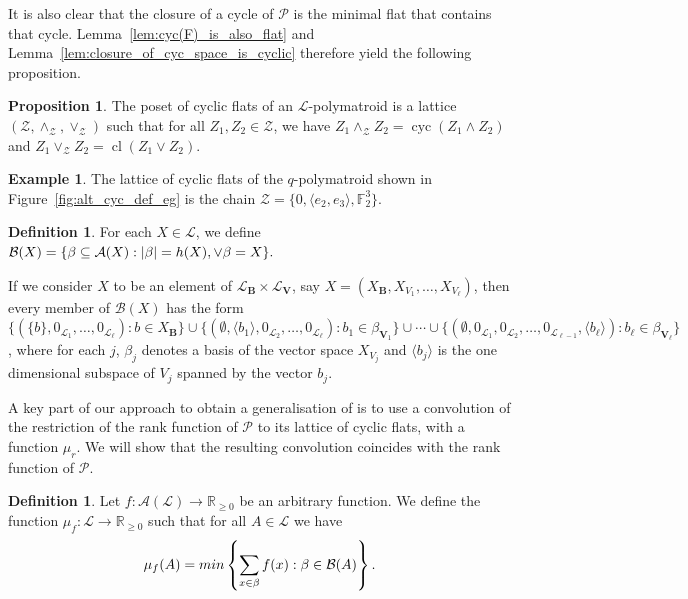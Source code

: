 \documentclass[a4paper,11pt,reqno]{article}
\theoremstyle{definition}
\newtheorem{definition}[theorem]{{{Definition}}}
\newtheorem{example}[theorem]{{{Example}}}
\newtheorem{proposition}[theorem]{{{Proposition}}}
\newcommand{\mL}{\mathcal{L}}
\newcommand{\mP}{\mathcal{P}}
\newcommand{\mA}{\mathcal{A}}
\DeclareMathOperator{\cyc}{cyc}
\DeclareMathOperator{\cl}{cl}
\begin{document}
It is also clear that the closure of a cycle of $\mP$ is the minimal flat that contains that cycle. Lemma~\ref{lem:cyc(F)_is_also_flat} and Lemma~\ref{lem:closure_of_cyc_space_is_cyclic} therefore yield the following proposition.

\begin{proposition}\label{prop:cyc_flat_lattice}
    The poset of cyclic flats of an $\mL$-polymatroid is a lattice $(\mathcal{Z},\wedge_\mathcal{Z},\vee_\mathcal{Z})$ such that for all $Z_1,Z_2\in\mathcal{Z}$, we have $Z_1\wedge_\mathcal{Z}Z_2=\cyc(Z_1\wedge Z_2)$ and $Z_1\vee_\mathcal{Z}Z_2=\cl(Z_1\vee Z_2).$
\end{proposition}

\begin{example}
    The lattice of cyclic flats of the $q$-polymatroid shown in Figure~\ref{fig:alt_cyc_def_eg} is the chain 
    $\mathcal{Z}=\{0,\langle e_2,e_3\rangle,\mathbb{F}_2^3\}.$
\end{example}

\begin{definition}
    For each $X\in\mathcal{L}$, we define
    $\mathcal{B}(X)=\{\beta\subseteq\mA(X):|\beta|=\textup{h}(X),\vee\beta=X\}.$
\end{definition}

If we consider $X$ to be an element of $\mathcal{L}_\mathbf{B}\times\mathcal{L}_\mathbf{V}$, say $X=(X_{\mathbf{B}},X_{V_1},\dots,X_{V_\ell})$, then every member of $\mathcal{B}(X)$ has the form 
    $ \{ (\{b\},0_{\mL_1},\dots,0_{\mL_\ell} ): b \in X_\mathbf{B}\} \cup \{(\emptyset,\langle b_1 \rangle ,0_{\mL_2},\dots,0_{\mL_\ell} ): b_1 \in \beta_{\mathbf{V}_1}\}\cup \cdots \cup \{(\emptyset,0_{\mL_1},0_{\mL_2},\dots,0_{\mL_{\ell-1}}, \langle b_\ell \rangle): b_\ell \in \beta_{\mathbf{V}_\ell}\} $, where for each $j$, $\beta_j$ denotes a basis of the vector space $X_{V_j}$ and $\langle b_j \rangle$ is the one dimensional subspace of $V_j$ spanned by the vector $b_j$.


A key part of our approach to obtain a generalisation of \cite{Csirm20} is to use a convolution of the restriction of the rank function of $\mP$ to its lattice of cyclic flats, with a function $\mu_r$. We will show that the resulting convolution coincides with the rank function of $\mP$. 

\begin{definition}\label{not:mu_funct}
Let $f:\mA(\mathcal{L})\to\mathbb{R}_{\geq0}$ be an arbitrary function. We define the function $\mu_f:\mathcal{L}\to\mathbb{R}_{\geq0}$ such that for all  $A \in \mL$ we have
\[
\mu_f(A)=\textup{min}\left\{\sum_{x\in \beta}f(x):\beta\in \mathcal{B}(A)\right\}.
\]
\end{definition}
\end{document}
